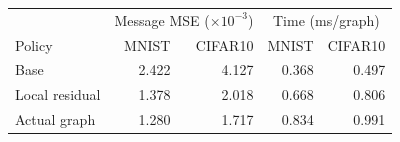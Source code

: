 \begin{tabular}{lrrrr}
\toprule
 & \multicolumn{2}{c}{Message MSE ($\times10^{-3}$)} & \multicolumn{2}{c}{Time (ms/graph)} \\
Policy & MNIST & CIFAR10 & MNIST & CIFAR10 \\
\midrule
Base & 2.422 & 4.127 & 0.368 & 0.497 \\
Local residual & 1.378 & 2.018 & 0.668 & 0.806 \\
Actual graph & 1.280 & 1.717 & 0.834 & 0.991 \\
\bottomrule
\end{tabular}
